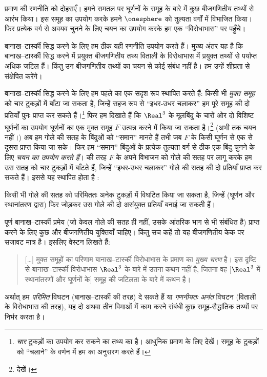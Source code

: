 \documentclass[../../../include/open-logic-section]{subfiles}
\begin{document}
प्रमाण की रणनीति को दोहराएँ। हमने समतल पर घूर्णनों के समूह के बारे में कुछ
बीजगणितीय तथ्यों से आरंभ किया। इस समूह का उपयोग करके हमने $\onesphere$ को
तुल्यता वर्गों में विभाजित किया। फिर प्रत्येक वर्ग से अवयव चुनने के लिए चयन
का उपयोग करके हम एक ``विरोधाभास'' पर पहुँचे।

बानाख--टार्स्की सिद्ध करने के लिए हम ठीक यही रणनीति उपयोग करते हैं। मुख्य
अंतर यह है कि बानाख--टार्स्की सिद्ध करने में प्रयुक्त बीजगणितीय तथ्य विताली
के विरोधाभास में प्रयुक्त तथ्यों से पर्याप्त अधिक जटिल हैं। किंतु उन
बीजगणितीय तथ्यों का चयन से कोई संबंध नहीं है। हम उन्हें शीघ्रता से संक्षेपित
करेंगे।

बानाख--टार्स्की सिद्ध करने के लिए हम पहले  का एक
सदृश रूप स्थापित करते हैं: किसी भी \emph{मुक्त समूह} को चार टुकड़ों में
बाँटा जा सकता है, जिन्हें सहज रूप से ``इधर-उधर चलाकर'' हम पूरे समूह की दो
प्रतियाँ पुनः प्राप्त कर सकते हैं।\footnote{\emph{चार} टुकड़ों का उपयोग कर
सकने का तथ्य \cite{Robinson1947} का है। आधुनिक प्रमाण के लिए
\citet[Theorem 5.2]{Wagon2016} देखें। समूह के टुकड़ों को ``चलाने'' के वर्णन
में हम \citet[p.~3]{Weston2003} का अनुसरण करते हैं।} फिर हम दिखाते हैं कि
$\Real^3$ के मूलबिंदु के चारों ओर दो विशिष्ट घूर्णनों का उपयोग घूर्णनों का
एक मुक्त समूह $F$ उत्पन्न करने में किया जा सकता है।\footnote{
\citet[Theorem 2.1]{Wagon2016} देखें।} (अभी तक चयन नहीं।) अब हम गोले की सतह
के बिंदुओं को ``समान'' मानते हैं तभी जब $F$ के किसी घूर्णन से एक से दूसरा
प्राप्त किया जा सके। फिर हम ``समान'' बिंदुओं के प्रत्येक तुल्यता वर्ग से ठीक
एक बिंदु चुनने के लिए \emph{चयन का उपयोग करते हैं}।
 की तरह $F$ के अपने विभाजन को गोले की सतह पर लागू
करके हम उस सतह को चार टुकड़ों में बाँटते हैं, जिन्हें ``इधर-उधर चलाकर'' गोले
की सतह की दो प्रतियाँ प्राप्त कर सकते हैं। इससे यह स्थापित होता है
\citep{Hausdorff1914}:

\begin{thm}
किसी भी गोले की सतह को परिमिततः अनेक टुकड़ों में विघटित किया जा सकता है,
जिन्हें (घूर्णन और स्थानांतरण द्वारा) फिर जोड़कर उस गोले की दो असंयुक्त
प्रतियाँ बनाई जा सकती हैं।
\end{thm}

पूर्ण बानाख--टार्स्की प्रमेय (जो केवल गोले की सतह ही नहीं, उसके आंतरिक भाग
से भी संबंधित है) प्राप्त करने के लिए कुछ और बीजगणितीय युक्तियाँ चाहिए।
किंतु सच कहें तो यह बीजगणितीय केक पर सजावट मात्र है। इसलिए वेस्टन लिखते हैं:
\begin{quote}	
  [\ldots] मुक्त समूहों का परिणाम बानाख--टार्स्की विरोधाभास के प्रमाण का
  \emph{मुख्य चरण} है। इस दृष्टि से बानाख--टार्स्की विरोधाभास $\Real^3$ के
  बारे में उतना कथन नहीं है, जितना वह [$\Real^3$ में स्थानांतरणों और
  घूर्णनों के] समूह की जटिलता के बारे में कथन है। \cite[p.~16]{Weston2003}
\end{quote}
अर्थात् हम \emph{परिमित} विघटन (बानाख--टार्स्की की तरह) दे सकते हैं या
\emph{गणनीयतः अनंत} विघटन (विताली के विरोधाभास की तरह), यह दो अथवा तीन
विमाओं में काम करने संबंधी कुछ समूह-सैद्धांतिक तथ्यों पर निर्भर करता है।
\end{document}
